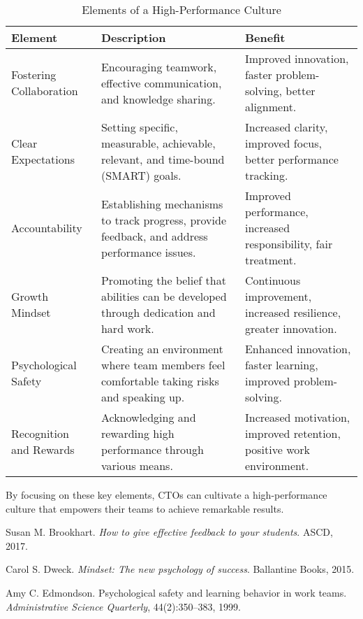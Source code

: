 \begin{longtable}{|p{4cm}|p{8cm}|p{4cm}|}
    \caption{Elements of a High-Performance Culture}
    \label{tab:high_performance_elements}                                                                                                                                                         \\
    \hline
    \textbf{Element}        & \textbf{Description}                                                                         & \textbf{Benefit}                                                     \\
    \hline
    Fostering Collaboration & Encouraging teamwork, effective communication, and knowledge sharing.                        & Improved innovation, faster problem-solving, better alignment.       \\
    \hline
    Clear Expectations      & Setting specific, measurable, achievable, relevant, and time-bound (SMART) goals.            & Increased clarity, improved focus, better performance tracking.      \\
    \hline
    Accountability          & Establishing mechanisms to track progress, provide feedback, and address performance issues. & Improved performance, increased responsibility, fair treatment.      \\
    \hline
    Growth Mindset          & Promoting the belief that abilities can be developed through dedication and hard work.       & Continuous improvement, increased resilience, greater innovation.    \\
    \hline
    Psychological Safety    & Creating an environment where team members feel comfortable taking risks and speaking up.    & Enhanced innovation, faster learning, improved problem-solving.      \\
    \hline
    Recognition and Rewards & Acknowledging and rewarding high performance through various means.                          & Increased motivation, improved retention, positive work environment. \\
    \hline
\end{longtable}

By focusing on these key elements, CTOs can cultivate a high-performance culture that empowers their teams to achieve remarkable results.


% 

\begin{thebibliography}{9}

    Susan M. Brookhart.
    \emph{How to give effective feedback to your students}.
    ASCD, 2017.

    Carol S. Dweck.
    \emph{Mindset: The new psychology of success}.
    Ballantine Books, 2015.

    Amy C. Edmondson.
    Psychological safety and learning behavior in work teams.
    \emph{Administrative Science Quarterly}, 44(2):350--383, 1999.

\end{thebibliography}
